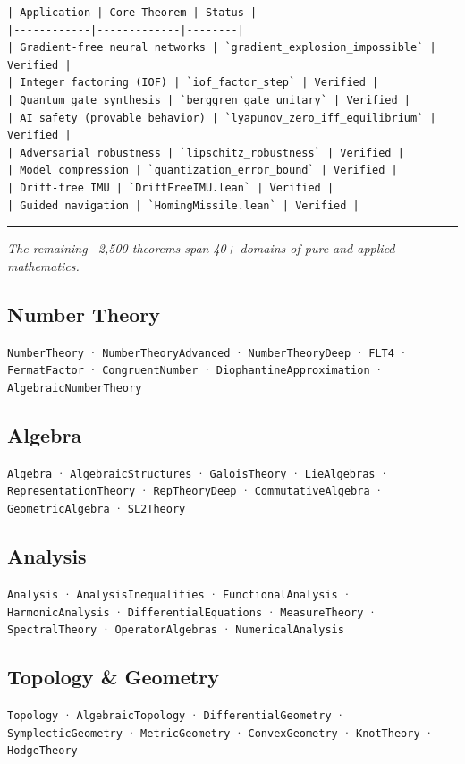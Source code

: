 \documentclass[12pt,a4paper,openany]{book}
\begin{document}
\begin{verbatim}
| Application | Core Theorem | Status |
|------------|-------------|--------|
| Gradient-free neural networks | `gradient_explosion_impossible` | Verified |
| Integer factoring (IOF) | `iof_factor_step` | Verified |
| Quantum gate synthesis | `berggren_gate_unitary` | Verified |
| AI safety (provable behavior) | `lyapunov_zero_iff_equilibrium` | Verified |
| Adversarial robustness | `lipschitz_robustness` | Verified |
| Model compression | `quantization_error_bound` | Verified |
| Drift-free IMU | `DriftFreeIMU.lean` | Verified |
| Guided navigation | `HomingMissile.lean` | Verified |
\end{verbatim}

\bigskip\hrule\bigskip


\textit{The remaining ~2,500 theorems span 40+ domains of pure and applied mathematics.}

\subsection{Number Theory}
\texttt{NumberTheory} · \texttt{NumberTheoryAdvanced} · \texttt{NumberTheoryDeep} · \texttt{FLT4} · \texttt{FermatFactor} · \texttt{CongruentNumber} · \texttt{DiophantineApproximation} · \texttt{AlgebraicNumberTheory}

\subsection{Algebra}
\texttt{Algebra} · \texttt{AlgebraicStructures} · \texttt{GaloisTheory} · \texttt{LieAlgebras} · \texttt{RepresentationTheory} · \texttt{RepTheoryDeep} · \texttt{CommutativeAlgebra} · \texttt{GeometricAlgebra} · \texttt{SL2Theory}

\subsection{Analysis}
\texttt{Analysis} · \texttt{AnalysisInequalities} · \texttt{FunctionalAnalysis} · \texttt{HarmonicAnalysis} · \texttt{DifferentialEquations} · \texttt{MeasureTheory} · \texttt{SpectralTheory} · \texttt{OperatorAlgebras} · \texttt{NumericalAnalysis}

\subsection{Topology \& Geometry}
\texttt{Topology} · \texttt{AlgebraicTopology} · \texttt{DifferentialGeometry} · \texttt{SymplecticGeometry} · \texttt{MetricGeometry} · \texttt{ConvexGeometry} · \texttt{KnotTheory} · \texttt{HodgeTheory}
\end{document}
